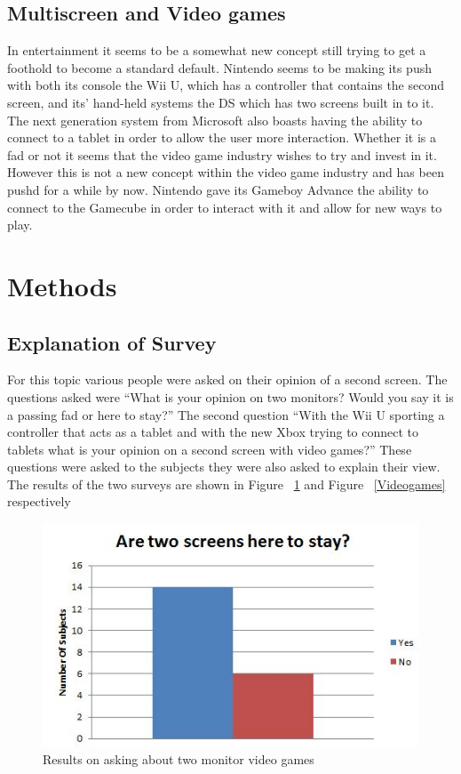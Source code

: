 \documentclass[11pt]{article}
\begin{document}
\subsection{Multiscreen and Video games}
In entertainment it seems to be a somewhat new concept still trying to get a foothold to become a standard default. Nintendo seems to be making its push with both its console the Wii U, which has a controller that contains the second screen, and its' hand-held systems the DS which has two  screens built in to it. The next generation system from Microsoft also boasts having the ability to connect to a tablet in order to allow the user more interaction. Whether it is a fad or not it seems that the video game industry wishes to try and invest in it. However this is not a new concept within the video game industry and has been pushd for a while by now. Nintendo gave its Gameboy Advance the ability to connect to the Gamecube in order to interact with it and allow for new ways to play.

\section{Methods}
\subsection{Explanation of Survey}
For this topic various people were asked on their opinion of a second screen. The questions asked were “What is your opinion on two monitors? Would you say it is a passing fad or here to stay?” The second question “With the Wii U sporting a controller that acts as a tablet and with the new Xbox trying to connect to tablets what is your opinion on a second screen with video games?” These questions were asked to the subjects they were also asked to explain their view. The results of the two surveys are shown in Figure ~\ref{monitor} and Figure ~\ref{Videogames} respectively

\begin{figure}[h!]
  \centering
    \includegraphics[width= 1\textwidth]{./Images/Monitors}
  \caption{Results on asking about two monitor video games}
 \label{monitor}
\end{figure}
\end{document}
